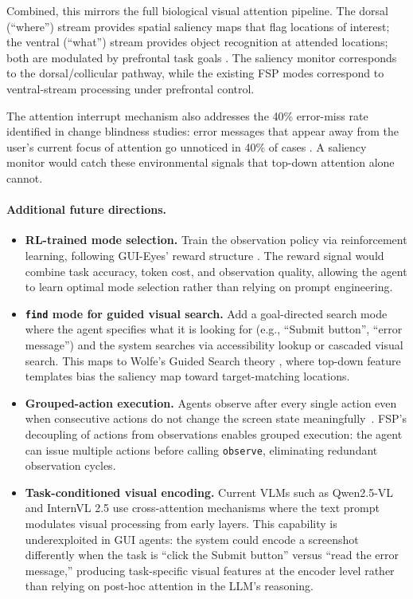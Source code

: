\documentclass[11pt,a4paper]{article}
\begin{document}
Combined, this mirrors the full biological visual attention pipeline. The dorsal (``where'') stream provides spatial saliency maps that flag locations of interest; the ventral (``what'') stream provides object recognition at attended locations; both are modulated by prefrontal task goals \cite{goodale1992separate, corbetta2002control}. The saliency monitor corresponds to the dorsal/collicular pathway, while the existing FSP modes correspond to ventral-stream processing under prefrontal control.

The attention interrupt mechanism also addresses the 40\% error-miss rate identified in change blindness studies: error messages that appear away from the user's current focus of attention go unnoticed in 40\% of cases \cite{nngroup-change-blindness}. A saliency monitor would catch these environmental signals that top-down attention alone cannot.

\paragraph{Additional future directions.}

\begin{itemize}
    \item \textbf{RL-trained mode selection.} Train the observation policy via reinforcement learning, following GUI-Eyes' reward structure \cite{gui-eyes}. The reward signal would combine task accuracy, token cost, and observation quality, allowing the agent to learn optimal mode selection rather than relying on prompt engineering.

    \item \textbf{\texttt{find} mode for guided visual search.} Add a goal-directed search mode where the agent specifies what it is looking for (e.g., ``Submit button'', ``error message'') and the system searches via accessibility lookup or cascaded visual search. This maps to Wolfe's Guided Search theory \cite{wolfe-guided-search}, where top-down feature templates bias the saliency map toward target-matching locations.

    \item \textbf{Grouped-action execution.} Agents observe after every single action even when consecutive actions do not change the screen state meaningfully~\cite{osworld-human}. FSP's decoupling of actions from observations enables grouped execution: the agent can issue multiple actions before calling \texttt{observe}, eliminating redundant observation cycles.

    \item \textbf{Task-conditioned visual encoding.} Current VLMs such as Qwen2.5-VL \cite{qwen25-vl} and InternVL 2.5 \cite{internvl-25} use cross-attention mechanisms where the text prompt modulates visual processing from early layers. This capability is underexploited in GUI agents: the system could encode a screenshot differently when the task is ``click the Submit button'' versus ``read the error message,'' producing task-specific visual features at the encoder level rather than relying on post-hoc attention in the LLM's reasoning.
\end{itemize}
\end{document}

